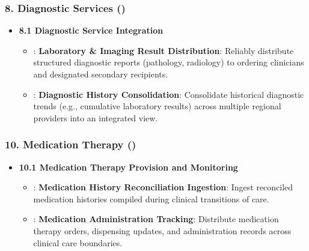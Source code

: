 \subsubsection*{8. Diagnostic Services (\texttt{})}
\label{rad:enabling:410}

\begin{itemize}

\item 
\textbf{8.1 Diagnostic Service Integration}


\begin{itemize}

\item 
\texttt{}: \textbf{Laboratory \& Imaging Result Distribution}: Reliably distribute structured diagnostic reports (pathology, radiology) to ordering clinicians and designated secondary recipients.



\item 
\texttt{}: \textbf{Diagnostic History Consolidation}: Consolidate historical diagnostic trends (e.g., cumulative laboratory results) across multiple regional providers into an integrated view.



\end{itemize}


\end{itemize}
\label{rad:enabling:414}
\subsubsection*{10. Medication Therapy (\texttt{})}
\label{rad:enabling:415}

\begin{itemize}

\item 
\textbf{10.1 Medication Therapy Provision and Monitoring}


\begin{itemize}

\item 
\texttt{}: \textbf{Medication History Reconciliation Ingestion}: Ingest reconciled medication histories compiled during clinical transitions of care.



\item 
\texttt{}: \textbf{Medication Administration Tracking}: Distribute medication therapy orders, dispensing updates, and administration records across clinical care boundaries.



\end{itemize}


\end{itemize}
\label{rad:enabling:419}

